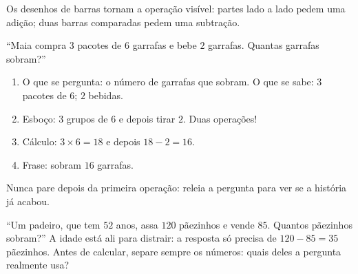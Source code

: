 \begin{omfigure}

{\small Os desenhos de barras tornam a operação visível: partes lado
a lado pedem uma adição; duas barras comparadas pedem uma
subtração.}
\end{omfigure}

\begin{example}\label{ex:g3:problems:twostep}
``Maia compra $3$ pacotes de $6$ garrafas e bebe $2$ garrafas.
Quantas garrafas sobram?''
\begin{enumerate}
  \item O que se pergunta: o número de garrafas que sobram. O que se
        sabe: $3$ pacotes de $6$; $2$ bebidas.
  \item Esboço: $3$ grupos de $6$ e depois tirar $2$. Duas
        operações!
  \item Cálculo: $3 \times 6 = 18$ e depois $18 - 2 = 16$.
  \item Frase: sobram $16$ garrafas.
\end{enumerate}
Nunca pare depois da primeira operação: releia a pergunta para ver
se a história já acabou.
\end{example}

\begin{example}\label{ex:g3:problems:trap}
``Um padeiro, que tem $52$ anos, assa $120$ pãezinhos e vende $85$.
Quantos pãezinhos sobram?'' A idade está ali para distrair: a
resposta só precisa de $120 - 85 = 35$ pãezinhos. Antes de calcular,
separe sempre os números: quais deles a pergunta realmente usa?
\end{example}

